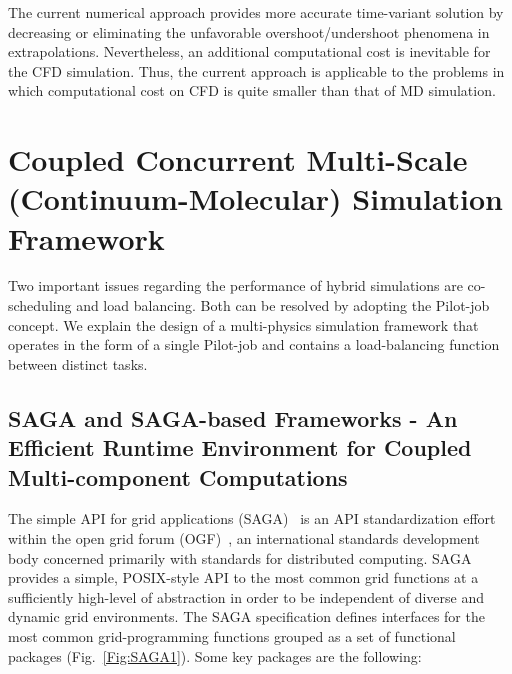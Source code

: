 \documentclass[preprint,12pt]{elsarticle}
\begin{document}
The current numerical approach provides more accurate time-variant solution
by decreasing or eliminating the unfavorable overshoot/undershoot phenomena
in extrapolations. Nevertheless, an additional computational cost is inevitable
for the CFD simulation. Thus, the current approach is applicable to the problems
in which computational cost on CFD is quite smaller than that of MD simulation.



\section{Coupled Concurrent Multi-Scale (Continuum-Molecular) Simulation Framework}
\label{sec:computational}

Two important issues regarding the performance of hybrid simulations are co-scheduling and load balancing. Both can be resolved by adopting the Pilot-job concept. We explain the design of a multi-physics simulation framework that operates in the form of a single Pilot-job and contains a load-balancing function between distinct tasks.

\subsection{SAGA and SAGA-based Frameworks - An Efficient Runtime Environment for Coupled Multi-component Computations}
\label{sec:computational_SAGAandBigJob}

The simple API for grid applications (SAGA)~\cite{saga_url} is an API standardization effort within the open grid forum (OGF)~\cite{ogf_web}, an international standards development body concerned primarily with standards for distributed computing. SAGA provides a simple, POSIX-style API to the most common grid functions at a sufficiently high-level of abstraction in order to be independent of diverse and dynamic grid environments. The SAGA specification defines interfaces for the most common grid-programming functions grouped as a set of functional packages (Fig.~\ref{Fig:SAGA1}). Some key packages are the following:
\end{document}
